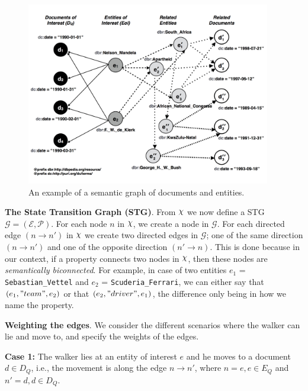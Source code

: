 \documentclass{article}
\DeclareRobustCommand{\rchi}{{\mathpalette\irchi\relax}}
\newcommand{\irchi}[2]{\raisebox{\depth}{$#1\chi$}}
\begin{document}
\begin{figure}[ht]
\begin{mdframed}
	\centering
	\includegraphics[width=0.95\textwidth]{example_graph}
\end{mdframed}
	\caption{An example of a semantic graph of documents and entities.}
	\label{fig:example_graph}
\end{figure}

\vspace{2mm}\noindent
{\bf The State Transition Graph (STG)}. From $\rchi$ we now define a STG $\mathcal{G} = (\mathcal{E}, \mathcal{P})$. For each node $n$ in $\rchi$, 
we create a node in $\mathcal{G}$. 
For each directed edge $(n \rightarrow n')$ in $\rchi$ 
we create two directed edges in $\mathcal{G}$; 
one of the same direction $(n \rightarrow n')$ and one of the 
opposite direction $(n' \rightarrow n)$. This is done because in our context, 
if a property connects two nodes in $\rchi$, 
then these nodes are {\em semantically biconnected}.   
For example, in case of two entities $e_1$ = \texttt{Sebastian\_Vettel}  
and $e_2$ = \texttt{Scuderia\_Ferrari}, we can either say that $(e_1, "team", e_2)$ 
or that $( e_2, "driver", e_1)$, the difference only being in how we name the property. 

\vspace{2mm}\noindent
{\bf Weighting the edges}. We consider the different scenarios where the walker 
can lie and move to, and specify the weights of the edges. 

\vspace{2mm}\noindent
{\bf Case 1:} The walker lies at an entity of interest $e$ and he moves to 
a document $d \in D_Q$, i.e., the movement is along the edge $n \rightarrow n'$, where
$n=e, e \in E_Q$ and $n'=d, d \in D_Q$. 
\end{document}

